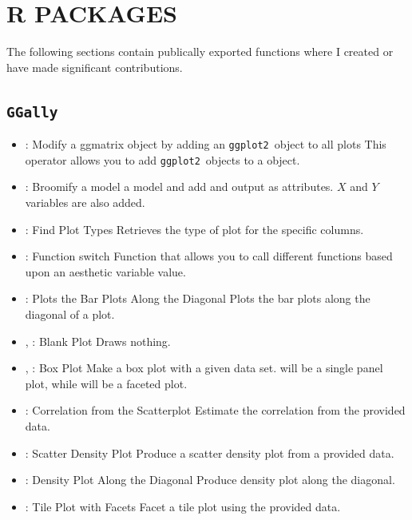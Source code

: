 \documentclass[stat,dissertation]{puthesis}\usepackage[]{graphicx}\usepackage{xcolor}
\newcommand{\pkg}[1]{\texttt{#1}}
\newcommand{\ggplot}{\pkg{ggplot2}}
\newcommand{\GGally}{\pkg{GGally}}
\newcommand{\tick}{\item[-]}
\begin{document}
\chapter{R PACKAGES}

The following sections contain publically exported functions where I created or have made significant contributions.

\section{\GGally}

\begin{itemize}
  \tick {}: Modify a ggmatrix object by adding an \ggplot~object to all plots \newline This operator allows you to add \ggplot~objects to a  object.
  \tick {}: Broomify a model \newline {} a model and add  and  output as attributes. $X$ and $Y$ variables are also added.
  \tick {}: Find Plot Types \newline Retrieves the type of plot for the specific columns.
  \tick {}: Function switch \newline Function that allows you to call different functions based upon an aesthetic variable value.
  \tick {}: Plots the Bar Plots Along the Diagonal \newline Plots the bar plots along the diagonal of a  plot.
  \tick {}, : Blank Plot \newline Draws nothing.
  \tick {}, : Box Plot \newline Make a box plot with a given data set.  will be a single panel plot, while  will be a faceted plot.
  \tick {}: Correlation from the Scatterplot \newline Estimate the correlation from the provided data.
  \tick {}: Scatter Density Plot \newline Produce a scatter density plot from a provided data.
  \tick {}: Density Plot Along the Diagonal \newline Produce density plot along the diagonal.
  \tick {}: Tile Plot with Facets \newline Facet a tile plot using the provided data.

\end{itemize}
\end{document}
